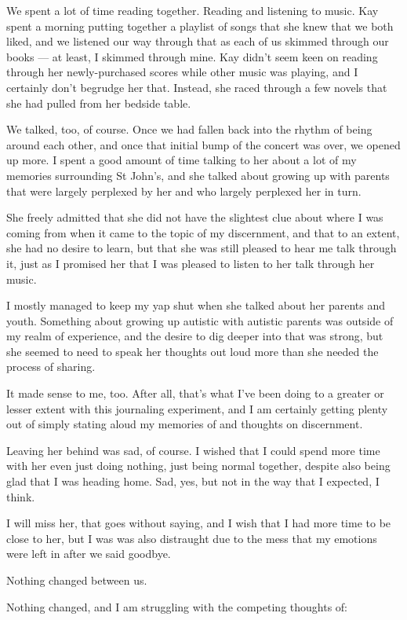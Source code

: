 We spent a lot of time reading together. Reading and listening to music. Kay spent a morning putting together a playlist of songs that she knew that we both liked, and we listened our way through that as each of us skimmed through our books --- at least, I skimmed through mine. Kay didn't seem keen on reading through her newly-purchased scores while other music was playing, and I certainly don't begrudge her that. Instead, she raced through a few novels that she had pulled from her bedside table.

We talked, too, of course. Once we had fallen back into the rhythm of being around each other, and once that initial bump of the concert was over, we opened up more. I spent a good amount of time talking to her about a lot of my memories surrounding St John's, and she talked about growing up with parents that were largely perplexed by her and who largely perplexed her in turn.

She freely admitted that she did not have the slightest clue about where I was coming from when it came to the topic of my discernment, and that to an extent, she had no desire to learn, but that she was still pleased to hear me talk through it, just as I promised her that I was pleased to listen to her talk through her music.

I mostly managed to keep my yap shut when she talked about her parents and youth. Something about growing up autistic with autistic parents was outside of my realm of experience, and the desire to dig deeper into that was strong, but she seemed to need to speak her thoughts out loud more than she needed the process of sharing.

It made sense to me, too. After all, that's what I've been doing to a greater or lesser extent with this journaling experiment, and I am certainly getting plenty out of simply stating aloud my memories of and thoughts on discernment.

Leaving her behind was sad, of course. I wished that I could spend more time with her even just doing nothing, just being normal together, despite also being glad that I was heading home. Sad, yes, but not in the way that I expected, I think.

I will miss her, that goes without saying, and I wish that I had more time to be close to her, but I was was also distraught due to the mess that my emotions were left in after we said goodbye.

Nothing changed between us.

Nothing changed, and I am struggling with the competing thoughts of:

